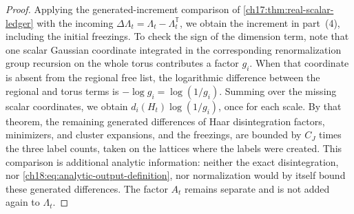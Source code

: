 \begin{proof}
Applying the generated-increment comparison of \cref{ch17:thm:real-scalar-ledger} with the incoming $\Delta\Lambda_t=\Lambda_t-\Lambda_t^{\mathbb T}$, we obtain the increment in part~(4), including the initial freezings. To check the sign of the dimension term, note that one scalar Gaussian coordinate integrated in the corresponding renormalization group recursion on the whole torus contributes a factor $g_i$. When that coordinate is absent from the regional free list, the logarithmic difference between the regional and torus terms is $-\log g_i=\log(1/g_i)$. Summing over the missing scalar coordinates, we obtain $d_i(H_t)\log(1/g_i)$, once for each scale. By that theorem, the remaining generated differences of Haar disintegration factors, minimizers, and cluster expansions, and the freezings, are bounded by $C_J$ times the three label counts, taken on the lattices where the labels were created. This comparison is additional analytic information: neither the exact disintegration, nor \eqref{ch18:eq:analytic-output-definition}, nor normalization would by itself bound these generated differences. The factor $A_t$ remains separate and is not added again to $\Lambda_t$.


\end{proof}
